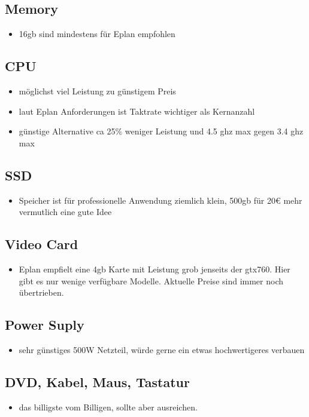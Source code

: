 \documentclass[11pt]{article}
\begin{document}
\subsection{Memory}
\label{sec:orga1e2bb1}
\begin{itemize}
\item 16gb sind mindestens für Eplan empfohlen
\end{itemize}
\subsection{CPU}
\label{sec:org97c341c}
\begin{itemize}
\item möglichst viel Leistung zu günstigem Preis
\item laut Eplan Anforderungen ist Taktrate wichtiger als Kernanzahl
\item günstige Alternative ca 25\% weniger Leistung und 4.5 ghz max gegen 3.4 ghz max
\end{itemize}
\subsection{SSD}
\label{sec:org432174e}
\begin{itemize}
\item Speicher ist für professionelle Anwendung ziemlich klein, 500gb für 20€ mehr vermutlich eine gute Idee
\end{itemize}
\subsection{Video Card}
\label{sec:org744eb3f}
\begin{itemize}
\item Eplan empfielt eine 4gb Karte mit Leistung grob jenseits der gtx760. Hier gibt es nur wenige verfügbare Modelle. Aktuelle Preise sind immer noch übertrieben.
\end{itemize}
\subsection{Power Suply}
\label{sec:org741f35c}
\begin{itemize}
\item sehr günstiges 500W Netzteil, würde gerne ein etwas hochwertigeres verbauen
\end{itemize}
\subsection{DVD, Kabel, Maus, Tastatur}
\label{sec:orgbbfe025}
\begin{itemize}
\item das billigste vom Billigen, sollte aber ausreichen.
\end{itemize}
\end{document}
